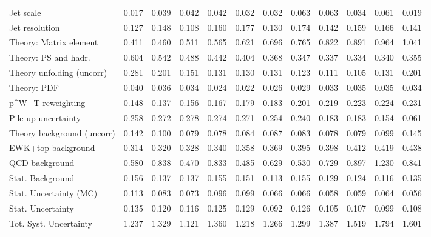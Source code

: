 \begin{tabular}{l|p{0.6cm}p{0.6cm}p{0.6cm}p{0.6cm}p{0.6cm}p{0.6cm}p{0.6cm}p{0.6cm}p{0.6cm}p{0.6cm}p{0.6cm}}
Jet scale                                & 0.017 & 0.039 & 0.042 & 0.042 & 0.032 & 0.032 & 0.063 & 0.063 & 0.034 & 0.061 & 0.019 \\
Jet resolution                           & 0.127 & 0.148 & 0.108 & 0.160 & 0.177 & 0.130 & 0.174 & 0.142 & 0.159 & 0.166 & 0.141 \\
Theory: Matrix element                   & 0.411 & 0.460 & 0.511 & 0.565 & 0.621 & 0.696 & 0.765 & 0.822 & 0.891 & 0.964 & 1.041 \\
Theory: PS and hadr.                     & 0.604 & 0.542 & 0.488 & 0.442 & 0.404 & 0.368 & 0.347 & 0.337 & 0.334 & 0.340 & 0.355 \\
Theory unfolding (uncorr)                & 0.281 & 0.201 & 0.151 & 0.131 & 0.130 & 0.131 & 0.123 & 0.111 & 0.105 & 0.131 & 0.201 \\
Theory: PDF                              & 0.040 & 0.036 & 0.034 & 0.024 & 0.022 & 0.026 & 0.029 & 0.033 & 0.035 & 0.035 & 0.034 \\
p^{W}_{T} reweighting                    & 0.148 & 0.137 & 0.156 & 0.167 & 0.179 & 0.183 & 0.201 & 0.219 & 0.223 & 0.224 & 0.231 \\
Pile-up uncertainty                      & 0.258 & 0.272 & 0.278 & 0.274 & 0.271 & 0.254 & 0.240 & 0.183 & 0.183 & 0.154 & 0.061 \\
Theory background (uncorr)               & 0.142 & 0.100 & 0.079 & 0.078 & 0.084 & 0.087 & 0.083 & 0.078 & 0.079 & 0.099 & 0.145 \\
EWK+top background                       & 0.314 & 0.320 & 0.328 & 0.340 & 0.358 & 0.369 & 0.395 & 0.398 & 0.412 & 0.419 & 0.438 \\
QCD background                           & 0.580 & 0.838 & 0.470 & 0.833 & 0.485 & 0.629 & 0.530 & 0.729 & 0.897 & 1.230 & 0.841 \\
Stat. Background                         & 0.156 & 0.137 & 0.137 & 0.155 & 0.151 & 0.113 & 0.155 & 0.129 & 0.124 & 0.116 & 0.135 \\
Stat. Uncertainty (MC)                   & 0.113 & 0.083 & 0.073 & 0.096 & 0.099 & 0.066 & 0.066 & 0.058 & 0.059 & 0.064 & 0.056 \\
\hline
Stat. Uncertainty                        & 0.135 & 0.120 & 0.116 & 0.125 & 0.129 & 0.092 & 0.126 & 0.105 & 0.107 & 0.099 & 0.108 \\
\hline
Tot. Syst. Uncertainty                   & 1.237 & 1.329 & 1.121 & 1.360 & 1.218 & 1.266 & 1.299 & 1.387 & 1.519 & 1.794 & 1.601 \\
\hline
\end{tabular}
